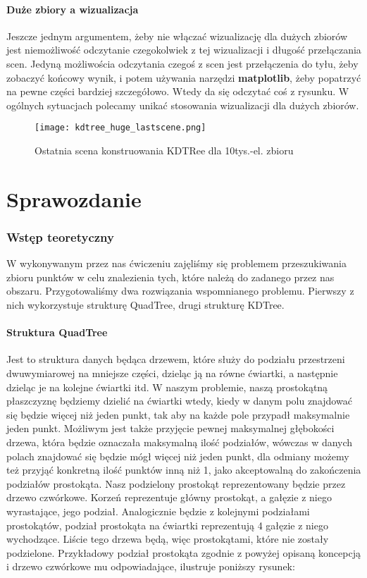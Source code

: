 \documentclass[a4paper, 12pt]{article}
\begin{document}
    \subsection{Duże zbiory a wizualizacja}
      \quad Jeszcze jednym argumentem, żeby nie włączać wizualizację dla dużych zbiorów jest niemożliwość odczytanie czegokolwiek z tej wizualizacji i długość przełączania scen. Jedyną możliwościa odczytania czegoś z scen jest przełączenia do tyłu, żeby zobaczyć końcowy wynik, i potem używania narzędzi \textbf{matplotlib}, żeby popatrzyć na pewne części bardziej szczegółowo. Wtedy da się odczytać coś z rysunku. W ogólnych sytuacjach polecamy unikać stosowania wizualizacji dla dużych zbiorów.

      \begin{figure}[h!]
      \centering
        \texttt{[image: kdtree\_huge\_lastscene.png]}
        \caption{Ostatnia scena konstruowania KDTRee dla 10tys.-el. zbioru}
      \end{figure}

\newpage
\part{Sprawozdanie}
  \setcounter{section}{0}

  \section{Wstęp teoretyczny}
    \quad W wykonywanym przez nas ćwiczeniu zajęliśmy się problemem przeszukiwania zbioru punktów w celu znalezienia tych, które należą do zadanego przez nas obszaru. Przygotowaliśmy dwa rozwiązania wspomnianego problemu. Pierwszy z nich wykorzystuje strukturę QuadTree, drugi strukturę KDTree.

    \subsection{Struktura QuadTree}
      \quad Jest to struktura danych będąca drzewem, które służy do podziału przestrzeni dwuwymiarowej na mniejsze części, dzieląc ją na równe ćwiartki, a następnie dzieląc je na kolejne ćwiartki itd. W naszym problemie, naszą prostokątną płaszczyznę będziemy dzielić na ćwiartki wtedy, kiedy w danym polu znajdować się będzie więcej niż jeden punkt, tak aby na każde pole przypadł maksymalnie jeden punkt. Możliwym jest także przyjęcie pewnej maksymalnej głębokości drzewa, która będzie oznaczała maksymalną ilość podziałów, wówczas w danych polach znajdować się będzie mógł więcej niż jeden punkt, dla odmiany możemy też przyjąć konkretną ilość punktów inną niż 1, jako akceptowalną do zakończenia podziałów prostokąta.  Nasz podzielony prostokąt reprezentowany będzie przez drzewo czwórkowe. Korzeń reprezentuje główny prostokąt, a gałęzie z niego wyrastające, jego podział. Analogicznie będzie z kolejnymi podziałami prostokątów, podział prostokąta na ćwiartki reprezentują 4 gałęzie z niego wychodzące. Liście tego drzewa będą, więc prostokątami, które nie zostały podzielone. Przykładowy podział prostokąta zgodnie z powyżej opisaną koncepcją i drzewo czwórkowe mu odpowiadające, ilustruje poniższy rysunek: 
\end{document}
